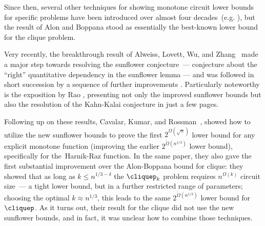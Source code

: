 Since then, several other techniques for showing monotone circuit lower bounds for specific problems have been introduced over almost four decades~(e.g. \cite{andreev1985method,andreev1987method,jukna1999combinatorics,garg2018monotone,goos2019adventures,cavalar2023}), but the result of Alon and Boppana stood as essentially the best-known lower bound for the clique problem.

Very recently, the breakthrough result of Alweiss, Lovett, Wu, and Zhang~\cite{alweiss20} made a major step towards resolving the sunflower conjecture~--- conjecture about the ``right'' quantitative dependency in the sunflower lemma --- and was followed in short succession by a sequence of further improvements \cite{bell2021note,Rao2020Coding,Tao2020sunflower, Hu2021sunflower, rao2023sunflowers}. Particularly noteworthy is the exposition by Rao \cite{rao2023sunflowers}, presenting not only the improved sunflower bounds but also the resolution of the Kahn-Kalai conjecture in just a few pages.

Following up on these results, Cavalar, Kumar, and Rossman~\cite{cavalar2022}, showed how to utilize the new sunflower bounds to prove the first $2^{\Omega(\sqrt{n})}$ lower bound for any explicit monotone function (improving the earlier $2^{\tilde{\Omega}(n^{1/3})}$ lower bound), specifically for the~Harnik-Raz function\cite{harnik00lower}. In the same paper, they also gave the first substantial improvement over the Alon-Boppana bound for clique: they showed that as long as $k \leq n^{1/3 - \delta}$ the $\cliquep_k$ problem requires $n^{\Omega(k)}$ circuit size~--- a tight lower bound, but in a further restricted range of parameters; choosing the optimal $k \approx n^{1/3}$, this leads to the same $2^{\tilde{\Omega}(n^{1/3})}$ lower bound for $\cliquep$. As it turns out, their result for the clique did not use the new sunflower bounds, and in fact, it was unclear how to combine those techniques.

